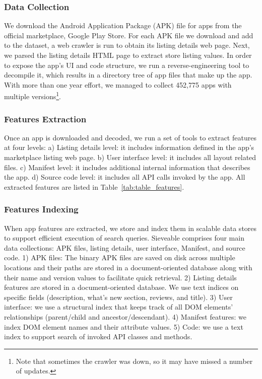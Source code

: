 \subsubsection{Data Collection}
We download the Android Application Package (APK) file for apps from the official marketplace, Google Play Store.
For each APK file we download and add to the dataset, a web crawler is run to obtain its listing details web page.
Next, we parsed the listing details HTML page to extract store listing values.
In order to expose the app's UI and code structure, we run a reverse-engineering tool to decompile it, which results in a directory tree of app files that make up the app. 
With more than one year effort, we managed to collect 452,775 apps with multiple versions\footnote{Note that sometimes the crawler was down, so it may have missed a number of updates.}.

\subsubsection{Features Extraction}
Once an app is downloaded and decoded, we run a set of tools to extract features at four levels:
a) Listing details level: it includes information defined in the app's marketplace listing web page.
b) User interface level: it includes all layout related files.
c) Manifest level: it includes additional internal information that describes the app.
d) Source code level: it includes all API calls invoked by the app.
All extracted features are listed in Table~\ref{tab:table_features}.

\subsubsection{Features Indexing}
When app features are extracted, we store and index them in scalable data stores to support efficient execution of search queries.
Sieveable comprises four main data collections: APK files, listing details, user interface, Manifest, and source code.
1) APK files: The binary APK files are saved on disk across multiple locations and their paths are stored in a document-oriented database along with their name and version values to facilitate quick retrieval.
2) Listing details features are stored in a document-oriented database.
We use text indices on specific fields (description, what's new section, reviews, and title).
3) User interface: we use a structural index that keeps track of all DOM elements' relationships (parent/child and ancestor/descendant).
4) Manifest features: we index DOM element names and their attribute values.
5) Code: we use a text index to support search of invoked API classes and methods.

